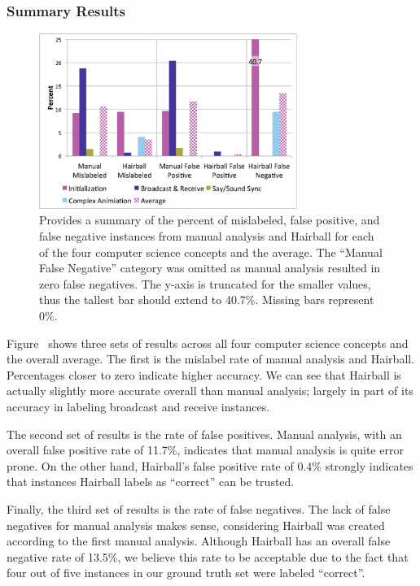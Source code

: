 \subsubsection{Summary Results}
\begin{figure}[!t]
\centering \includegraphics[trim=.3in .15in .3in .15in, clip,
  width=3.3in]{graphs/AutoSummary.eps}
\caption{Provides a summary of the percent of mislabeled, false positive, and
  false negative instances from manual analysis and Hairball for each of the
  four computer science concepts and the average. The ``Manual False Negative''
  category was omitted as manual analysis resulted in zero false negatives. The
  y-axis is truncated for the smaller values, thus the tallest bar should
  extend to 40.7\%. Missing bars represent 0\%.}  
\end{figure}

Figure~ shows three sets of results across all four
computer science concepts and the overall average. The first is the mislabel
rate of manual analysis and Hairball. Percentages closer to zero indicate
higher accuracy. We can see that Hairball is actually slightly more accurate
overall than manual analysis; largely in part of its accuracy in labeling
broadcast and receive instances.

The second set of results is the rate of false positives. Manual analysis, with
an overall false positive rate of 11.7\%, indicates that manual analysis is
quite error prone. On the other hand, Hairball's false positive rate of 0.4\%
strongly indicates that instances Hairball labels as ``correct'' can be
trusted.

Finally, the third set of results is the rate of false negatives. The lack of
false negatives for manual analysis makes sense, considering Hairball was
created according to the first manual analysis. Although Hairball has an
overall false negative rate of 13.5\%, we believe this rate to be acceptable
due to the fact that four out of five instances in our ground truth set were
labeled ``correct''.
